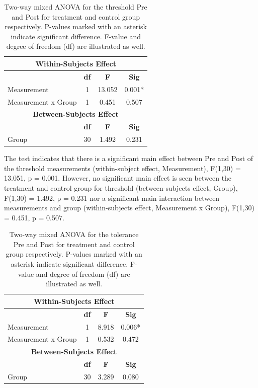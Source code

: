 \begin{table}[ht]
\caption{Two-way mixed ANOVA for the threshold Pre and Post for treatment and control group respectively. P-values marked with an asterisk indicate significant difference. F-value and degree of freedom (df) are illustrated as well.}
\centering
\begin{tabular}{l c c c}
\toprule
\multicolumn{4}{c}{\textbf{Within-Subjects Effect}} \\
\midrule
& \textbf{df} &\textbf{F} & \textbf{Sig} \\ [0.5ex] %
Measurement & 1 & 13.052 &  0.001* \\
Measurement x Group & 1 & 0.451 & 0.507 \\
\toprule
\multicolumn{4}{c}{\textbf{Between-Subjects Effect}} \\
\midrule 
& \textbf{df} & \textbf{F} & \textbf{Sig} \\ [0.5ex] %
Group & 30 & 1.492 &  0.231 \\
\hline
\end{tabular}
\label{table:TWOWAYANOVA1}
\end{table}

\noindent
The test indicates that there is a significant main effect between Pre and Post of the threshold measurements (within-subject effect, Measurement), F(1,30) = 13.051, p = 0.001. However, no significant main effect is seen between the treatment and control group for threshold (between-subjects effect, Group), F(1,30) = 1.492, p = 0.231 nor a significant main interaction between measurements and group (within-subjects effect, Measurement x Group), F(1,30) = 0.451, p = 0.507. 

\begin{table}[ht]
\caption{Two-way mixed ANOVA for the tolerance Pre and Post for treatment and control group
respectively. P-values marked with an asterisk indicate significant difference. F-value and degree of
freedom (df) are illustrated as well.}
\centering
\begin{tabular}{l c c c}
\toprule
\multicolumn{4}{c}{\textbf{Within-Subjects Effect}} \\
\midrule  
& \textbf{df} & \textbf{F} & \textbf{Sig} \\ [0.5ex] %
Measurement & 1 &  8.918 &  0.006* \\
Measurement x Group & 1 & 0.532 & 0.472 \\
\toprule
\multicolumn{4}{c}{\textbf{Between-Subjects Effect}} \\
\midrule
 & \textbf{df} & \textbf{F} & \textbf{Sig} \\ [0.5ex] %
Group & 30 & 3.289 &  0.080 \\
\hline
\end{tabular}
\label{table:TWOWAYANOVA2}
\end{table}

